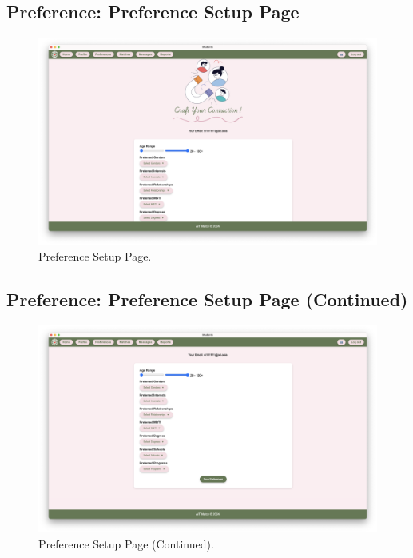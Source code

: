         \subsection{Preference: Preference Setup Page}
        \begin{figure}[h]
                \centering
                \captionsetup{justification=centering, singlelinecheck=false, labelsep=space}
                \includegraphics[width=5in]{figures/results/preferences/set-preference-page.png} 
                \caption{Preference Setup Page.}
                \label{fig:set-preference-page-2}
            \end{figure}

        \subsection{Preference: Preference Setup Page (Continued)}
        \begin{figure}[h]
                \centering
                \captionsetup{justification=centering, singlelinecheck=false, labelsep=space}
                \includegraphics[width=5in]{figures/results/preferences/set-preference-page-2.png} 
                \caption{Preference Setup Page (Continued).}
                \label{fig:set-preference-page-2}
            \end{figure}
        \newpage
